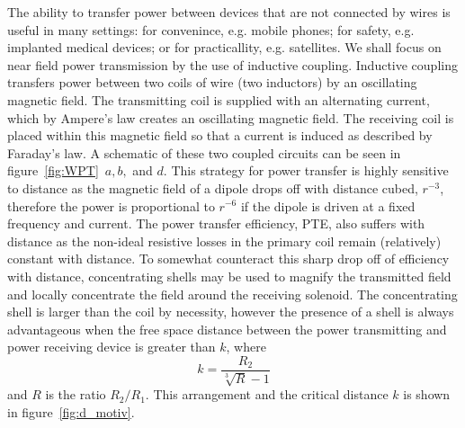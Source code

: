 \documentclass[11pt]{iopart}
\begin{document}
The ability to transfer power between devices that are not connected
by wires is useful in many settings: for convenince, e.g. mobile
phones; for safety, e.g. implanted medical devices; or for
practicallity, e.g. satellites. We shall focus on near field power
transmission by the use of inductive coupling. Inductive coupling
transfers power between two coils of wire (two inductors) by an
oscillating magnetic field.  The transmitting coil is supplied with an
alternating current, which by Ampere's law creates an oscillating
magnetic field. The receiving coil is placed within this magnetic
field so that a current is induced as described by Faraday's law. A
schematic of these two coupled circuits can be seen in
figure~\ref{fig:WPT}~$a, b,$ and $d$. This strategy for power transfer
is highly sensitive to distance as the magnetic field of a dipole
drops off with distance cubed, $r^{-3}$, therefore the power is
proportional to $r^{-6}$ if the dipole is driven at a fixed frequency
and current.  The power transfer efficiency, PTE, also suffers with
distance as the non-ideal resistive losses in the primary coil remain
(relatively) constant with distance. To somewhat counteract this sharp
drop off of efficiency with distance, concentrating shells may be used
to magnify the transmitted field and locally concentrate the field
around the receiving solenoid. The concentrating shell is larger than
the coil by necessity, however the presence of a shell is always
advantageous when the free space distance between the power
transmitting and power receiving device is greater than $k$, where
\begin{equation}
k = \frac{R_2}{\sqrt[3]{R}-1}
\end{equation}
and $R$ is the ratio $R_2/R_1$. This arrangement and the critical
distance $k$ is shown in figure~\ref{fig:d_motiv}.\\



\end{document}
